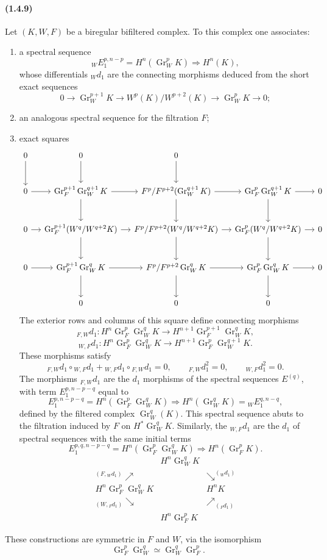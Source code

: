 \documentclass[10pt]{article}
\newcommand{\Gr}{\operatorname{Gr}}
\begin{document}
\paragraph{(1.4.9)} Let $(K,W,F)$ be a biregular bifiltered complex. To this complex one associates:
\begin{enumerate}[label=\alph*)]
\item a spectral sequence
\[
{}_WE_1^{p,n-p}=H^n(\Gr_W^pK)\Rightarrow H^n(K),
\]
whose differentials ${}_Wd_1$ are the connecting morphisms deduced from the short exact sequences
\[
0\to\Gr_W^{p+1}K\to W^p(K)/W^{p+2}(K)\to\Gr_W^pK\to0;
\]
\item an analogous spectral sequence for the filtration $F$;
\item exact squares
\[
\begin{tikzcd}[column sep=small,row sep=large]
0 \arrow[d] & 0 \arrow[d] & 0 \arrow[d] & \\
0 \arrow[r] & \Gr_F^{p+1}\Gr_W^{q+1}K \arrow[r] \arrow[d] & F^p/F^{p+2}(\Gr_W^{q+1}K) \arrow[r] \arrow[d] & \Gr_F^{p}\Gr_W^{q+1}K \arrow[r] \arrow[d] & 0\\
0 \arrow[r] & \Gr_F^{p+1}(W^q/W^{q+2}K) \arrow[r] \arrow[d] & F^p/F^{p+2}(W^q/W^{q+2}K) \arrow[r] \arrow[d] & \Gr_F^{p}(W^q/W^{q+2}K) \arrow[r] \arrow[d] & 0\\
0 \arrow[r] & \Gr_F^{p+1}\Gr_W^{q}K \arrow[r] \arrow[d] & F^p/F^{p+2}\Gr_W^{q}K \arrow[r] \arrow[d] & \Gr_F^{p}\Gr_W^{q}K \arrow[r] \arrow[d] & 0\\
& 0 & 0 & 0
\end{tikzcd}
\]
The exterior rows and columns of this square define connecting morphisms
\[
{}_{F,W}d_1:H^n\Gr_F^p\Gr_W^qK\longrightarrow H^{n+1}\Gr_F^{p+1}\Gr_W^qK,
\]
\[
{}_{W,F}d_1:H^n\Gr_F^p\Gr_W^qK\longrightarrow H^{n+1}\Gr_F^p\Gr_W^{q+1}K.
\]
These morphisms satisfy
\[
{}_{F,W}d_1\circ{}_{W,F}d_1+{}_{W,F}d_1\circ{}_{F,W}d_1=0,
\qquad
{}_{F,W}d_1^2=0,
\qquad
{}_{W,F}d_1^2=0.
\]
The morphisms ${}_{F,W}d_1$ are the $d_1$ morphisms of the spectral sequences $E^{(q)}$, with term $E_1^{p,n-p-q}$ equal to
\[
\tag{1.4.9.1}
E_1^{p,n-p-q}=H^n(\Gr_F^p\Gr_W^qK)\Rightarrow H^n(\Gr_W^qK)={}_WE_1^{q,n-q},
\]
defined by the filtered complex $\Gr_W^q(K)$. This spectral sequence abuts to the filtration induced by $F$ on $H^*\Gr_W^qK$. Similarly, the ${}_{W,F}d_1$ are the $d_1$ of spectral sequences with the same initial terms
\[
\tag{1.4.9.2}
E_1^{p,q,n-p-q}=H^n(\Gr_F^p\Gr_W^qK)\Rightarrow H^n(\Gr_F^pK).
\]
\[
\begin{array}{ccc}
& H^n\Gr_W^qK & \\[0.4em]
{}^{(F,{}_Wd_1)}\nearrow & & \searrow^{({}_Wd_1)}\\[0.4em]
H^n\Gr_F^p\Gr_W^qK & & H^nK\\[0.4em]
{}_{(W,{}_Fd_1)}\searrow & & \nearrow_{({}_Fd_1)}\\[0.4em]
& H^n\Gr_F^pK &
\end{array}
\]
\end{enumerate}
These constructions are symmetric in $F$ and $W$, via the isomorphism
\[
\Gr_F^p\Gr_W^q\simeq\Gr_W^q\Gr_F^p.
\]
\end{document}
